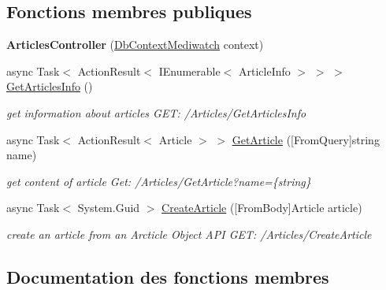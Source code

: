 \subsection*{Fonctions membres publiques}
\begin{DoxyCompactItemize}
\item 
\mbox{\label{class_blazing_blog_1_1_server_1_1_controllers_1_1_articles_controller_a3881e802459fed1ecf975c20c9b17444}} 
{\bfseries Articles\+Controller} (\hyperlink{class_server_1_1_db_context_mediwatch}{Db\+Context\+Mediwatch} context)
\item 
async Task$<$ Action\+Result$<$ I\+Enumerable$<$ Article\+Info $>$ $>$ $>$ \hyperlink{class_blazing_blog_1_1_server_1_1_controllers_1_1_articles_controller_a9970ba338169d8ef258c10663bf211b1}{Get\+Articles\+Info} ()
\begin{DoxyCompactList}\small\item\em get information about articles G\+ET\+: /\+Articles/\+Get\+Articles\+Info \end{DoxyCompactList}\item 
async Task$<$ Action\+Result$<$ Article $>$ $>$ \hyperlink{class_blazing_blog_1_1_server_1_1_controllers_1_1_articles_controller_a69e1b42a4f3198d4737296e661f95a75}{Get\+Article} (\mbox{[}From\+Query\mbox{]}string name)
\begin{DoxyCompactList}\small\item\em get content of article Get\+: /\+Articles/\+Get\+Article?name=\{string\} \end{DoxyCompactList}\item 
async Task$<$ System.\+Guid $>$ \hyperlink{class_blazing_blog_1_1_server_1_1_controllers_1_1_articles_controller_a9569853c2a94646215f6bb863cb07be2}{Create\+Article} (\mbox{[}From\+Body\mbox{]}Article article)
\begin{DoxyCompactList}\small\item\em create an article from an Arcticle Object A\+PI G\+ET\+: /\+Articles/\+Create\+Article \end{DoxyCompactList}\end{DoxyCompactItemize}


\subsection{Documentation des fonctions membres}
\mbox{\label{class_blazing_blog_1_1_server_1_1_controllers_1_1_articles_controller_a9569853c2a94646215f6bb863cb07be2}} 
